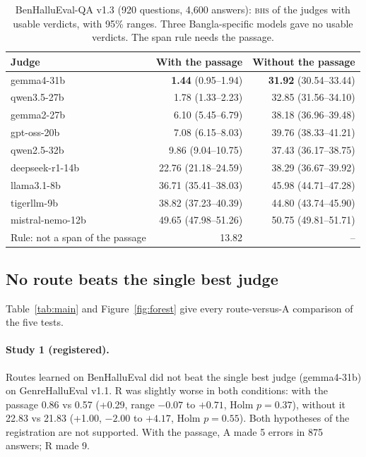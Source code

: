 \documentclass[pdflatex,sn-apa]{sn-jnl}
\newcommand{\BHS}{\textsc{bhs}}
\begin{document}
\begin{table}[t]
\centering\small
\caption{BenHalluEval-QA v1.3 (920 questions, 4,600 answers): \BHS{} of the judges with usable verdicts, with 95\%
ranges. Three Bangla-specific models gave no usable verdicts. The span rule needs the passage.}\label{tab:judges}
\begin{tabular}{@{}lrr@{}}
\toprule
Judge & With the passage & Without the passage \\
\midrule
gemma4-31b & \textbf{1.44} (0.95--1.94) & \textbf{31.92} (30.54--33.44) \\
qwen3.5-27b & 1.78 (1.33--2.23) & 32.85 (31.56--34.10) \\
gemma2-27b & 6.10 (5.45--6.79) & 38.18 (36.96--39.48) \\
gpt-oss-20b & 7.08 (6.15--8.03) & 39.76 (38.33--41.21) \\
qwen2.5-32b & 9.86 (9.04--10.75) & 37.43 (36.17--38.75) \\
deepseek-r1-14b & 22.76 (21.18--24.59) & 38.29 (36.67--39.92) \\
llama3.1-8b & 36.71 (35.41--38.03) & 45.98 (44.71--47.28) \\
tigerllm-9b & 38.82 (37.23--40.39) & 44.80 (43.74--45.90) \\
mistral-nemo-12b & 49.65 (47.98--51.26) & 50.75 (49.81--51.71) \\
\midrule
Rule: not a span of the passage & 13.82 & -- \\
\bottomrule
\end{tabular}
\end{table}

\subsection{No route beats the single best judge}

Table~\ref{tab:main} and Figure~\ref{fig:forest} give every route-versus-A comparison of the five tests.

\paragraph{Study 1 (registered).} Routes learned on BenHalluEval did not beat the single best judge (gemma4-31b) on
GenreHalluEval v1.1. R was slightly worse in both conditions: with the passage 0.86 vs 0.57 (+0.29, range $-0.07$ to
$+0.71$, Holm $p=0.37$), without it 22.83 vs 21.83 (+1.00, $-2.00$ to $+4.17$, Holm $p=0.55$). Both hypotheses of the
registration are not supported. With the passage, A made 5 errors in 875 answers; R made 9.
\end{document}
